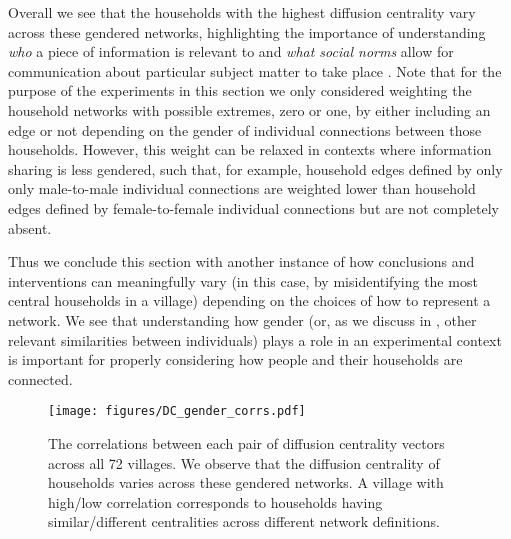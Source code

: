 Overall we see that the households with the highest diffusion centrality vary across these gendered networks, highlighting the importance of understanding \textit{who} a piece of information is relevant to \citep[e.g., the women in each household who buy groceries, see][]{alexander2022algorithms} and \textit{what social norms} allow for communication about particular subject matter to take place \citep[e.g., sharing information about maternal health may be stigmatized as only relevant and shareable among women, see][]{berti2015adequacy}. Note that for the purpose of the experiments in this section we only considered weighting the household networks with possible extremes, zero or one, by either including an edge or not depending on the gender of individual connections between those households. However, this weight can be relaxed in contexts where information sharing is less gendered, such that, for example, household edges defined by only only male-to-male individual connections are weighted lower than household edges defined by female-to-female individual connections but are not completely absent.

Thus we conclude this section with another instance of how conclusions and interventions can meaningfully vary (in this case, by misidentifying the most central households in a village) depending on the choices of how to represent a network. We see that understanding how gender (or, as we discuss in , other relevant similarities between individuals) plays a role in an experimental context is important for properly considering how people and their households are connected. 

\begin{figure}
    \centering
    \texttt{[image: figures/DC\_gender\_corrs.pdf]}
    \caption{The correlations between each pair of diffusion centrality vectors across all 72 villages. We observe that the diffusion centrality of households varies across these gendered networks. A village with high/low correlation corresponds to households having similar/different centralities across different network definitions.}
    \label{fig:gender_corrs}
\end{figure}

